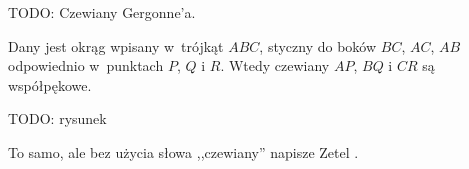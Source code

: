TODO: Czewiany Gergonne'a.

\begin{definition} %
%
\label{punkt_gergonne}
	Dany jest okrąg wpisany w~trójkąt $ABC$, styczny do boków $BC$, $AC$, $AB$ odpowiednio w~punktach $P$, $Q$ i $R$.
	Wtedy czewiany $AP$, $BQ$ i $CR$ są współpękowe.
\end{definition}

TODO: rysunek

To samo, ale bez użycia słowa ,,czewiany'' napisze Zetel \cite[s. 15, 25]{zetel_2020}.


%